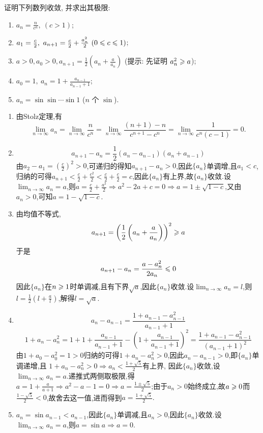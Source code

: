 \begin{exercise}[1.2.18]
    证明下列数列收敛, 并求出其极限:
    \begin{enumerate}[(1)]
        \item $a_n = \frac{n}{c^n}, \ (c>1)$;
        \item $a_1 = \frac{c}{2}, \ a_{n+1} = \frac{c}{2} + \frac{a_n^2}{2} \ (0 \leqslant c \leqslant 1)$;
        \item $a > 0, a_0 > 0, a_{n+1} = \frac{1}{2} \left(a_n + \frac{a}{a_n}\right)$ (提示: 先证明 $a_n^2 \geqslant a$);
        \item $a_0 = 1, \ a_n = 1 + \frac{a_{n-1}}{a_{n-1} + 1}$;
        \item $a_n = \sin \sin \cdots \sin 1$ ($n$ 个 $\sin$).
    \end{enumerate}
\end{exercise}

\begin{solution}
    \begin{enumerate}[(1)]
        \item 由Stolz定理,有$$\lim_{n \to \infty} a_n = \lim_{n \to \infty} \frac{n}{c^n} = \lim_{n \to \infty} \frac{(n+1)-n}{c^{n+1}-c^n} = \lim_{n \to \infty} \frac{1}{c^n(c-1)} = 0.$$
        \item $$a_{n+1} - a_n = \frac{1}{2}(a_{n}-a_{n-1})(a_{n}+a_{n-1})$$
              由$a_2 - a_1 = \left( \frac{c}{2} \right)^2 > 0 $,可递归的得知$a_{n+1} - a_n > 0$,因此$\{a_n\}$单调增,且$a_1 < c$,归纳的可得$a_{n+1} < \frac{c}{2} + \frac{c^2}{2} < \frac{c}{2} + \frac{c}{2} = c$,因此$\{a_n\}$有上界,故$\{a_n\}$收敛.设$\lim_{n \to \infty} a_n = a$,则$a = \frac{c}{2} + \frac{a^2}{2} \Rightarrow a^2 - 2a + c = 0 \Rightarrow a = 1 \pm \sqrt{1-c}$,又由$a_n > 0$,可知$a = 1 - \sqrt{1-c}$.
        \item 由均值不等式,$$a_{n+1} = \left( \frac{1}{2} \left( a_n + \frac{a}{a_n} \right) \right)^2 \geqslant a$$
              于是
              $$a_{n+1} - a_n = \frac{a - a_n^2}{2a_n} \leqslant 0$$
              因此$\{a_n\}$在$n \geqslant 1$时单调减,且有下界$\sqrt{a}$,因此$\{a_n\}$收敛.设$\lim_{n \to \infty} a_n = l$,则$l = \frac{1}{2} \left( l + \frac{a}{l} \right) $,解得$l= \sqrt{a}$.
        \item $$a_n - a_{n-1} = \frac{1+ a_{n-1} - a_{n-1}^2}{a_{n-1} + 1} $$
              $$1 + a_n - a_n^2 = 1 + 1 + \frac{a_{n-1}}{a_{n-1} + 1} - \left( 1 + \frac{a_{n-1}}{a_{n-1} + 1} \right)^2 = \frac{1 + a_{n-1} - a_{n-1}^2}{(a_{n-1} + 1)^2}$$
              由$1+a_0 -a_0^2 = 1 > 0$归纳的可得$1 + a_n - a_n^2 > 0$,因此$a_n - a_{n-1} > 0$,即$\{a_n\}$单调递增,且
              $1 + a_n - a_n^2 > 0 \Rightarrow a_n < \frac{1 + \sqrt{5}}{2}$有上界,
              因此$\{a_n\}$收敛,设$\lim_{n\to\infty}a_n=a$.递推式两侧取极限,得$a = 1 + \frac{a}{a+1} \Rightarrow a^2 - a - 1 = 0 \Rightarrow a = \frac{1 \pm \sqrt{5}}{2}$;由于$a_n>0$始终成立,故$a\geqslant 0$而$\frac{1 -\sqrt{5}}{2}<0$,故舍去这一值,进而得到$a=\frac{1 + \sqrt{5}}{2}.$
        \item $a_n = \sin a_{n-1} < a_{n-1}$,因此$\{a_n\}$单调减,且$a_n > 0$,因此$\{a_n\}$收敛.设$\lim_{n \to \infty} a_n = a$,则$a = \sin a \Rightarrow a = 0$.
    \end{enumerate}
\end{solution}

